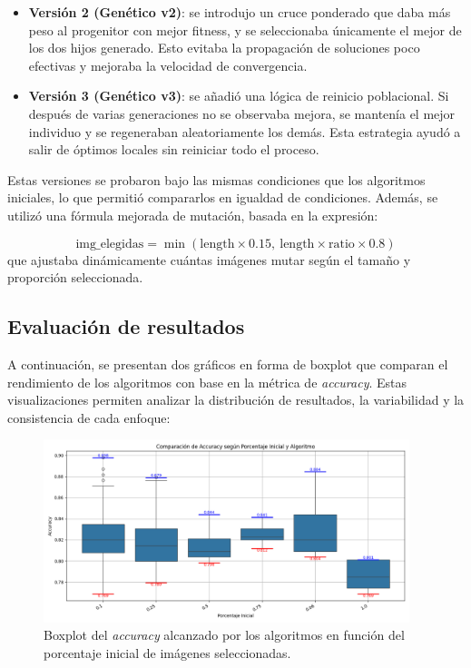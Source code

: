 \begin{itemize}
    \item \textbf{Versión 2 (Genético v2)}: se introdujo un cruce ponderado que daba más peso al progenitor con mejor fitness,
          y se seleccionaba únicamente el mejor de los dos hijos generado.
          Esto evitaba la propagación de soluciones poco efectivas y mejoraba la velocidad de convergencia.
    \item \textbf{Versión 3 (Genético v3)}: se añadió una lógica de reinicio poblacional. Si después de varias generaciones
          no se observaba mejora, se mantenía el mejor individuo y se regeneraban aleatoriamente los demás.
          Esta estrategia ayudó a salir de óptimos locales sin reiniciar todo el proceso.
\end{itemize}

Estas versiones se probaron bajo las mismas condiciones que los algoritmos iniciales, lo que permitió compararlos en igualdad de condiciones.
Además, se utilizó una fórmula mejorada de mutación, basada en la expresión:


\[
    \mathrm{img\_elegidas} = \min\left(\mathrm{length} \times 0.15,\ \mathrm{length} \times \mathrm{ratio} \times 0.8\right)
\]
que ajustaba dinámicamente cuántas imágenes mutar según el tamaño y proporción seleccionada.


\subsection{Evaluación de resultados}\label{sec:evaluacion-de-resultados}
A continuación, se presentan dos gráficos en forma de boxplot que comparan el rendimiento de los algoritmos con base en la métrica de \textit{accuracy}.
Estas visualizaciones permiten analizar la distribución de resultados, la variabilidad y la consistencia de cada enfoque:

\begin{figure}[!h]
    \centering
    \includegraphics[width=0.95\textwidth]{imagenes/mobilenet-BOXPLOT-accuracy-porcentaje}
    \caption{Boxplot del \textit{accuracy} alcanzado por los algoritmos en función del porcentaje inicial de imágenes seleccionadas.}
    \label{fig:boxplot-accuracy-porcentaje}
\end{figure}

